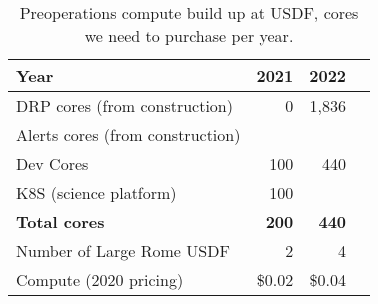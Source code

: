 \tiny \begin{longtable} { |p{}  |r  |r  |r |} 
\caption{Preoperations compute build up at USDF, cores we need to purchase per year. \label{tab:preCompute}}\\ 
\hline 
\textbf{Year}&\textbf{2021}&\textbf{2022} \\ \hline
{DRP cores (from construction)}&{0}&{1,836} \\ \hline
{Alerts cores (from construction)}&{}&{} \\ \hline
{Dev Cores}&{100}&{440} \\ \hline
{K8S (science platform)}&{100}&{} \\ \hline
\textbf{Total cores}&\textbf{200}&\textbf{440} \\ \hline
{Number of Large Rome USDF}&{2}&{4} \\ \hline
{Compute (2020 pricing)}&{\$0.02}&{\$0.04} \\ \hline
\end{longtable} \normalsize
